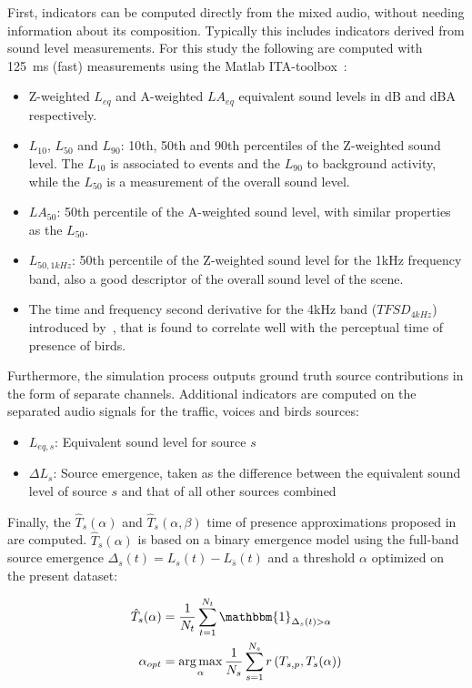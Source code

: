 \documentclass[11pt,a4paper]{article}
\DeclareMathOperator*{\argmax}{arg\,max}
\begin{document}
First, indicators can be computed directly from the mixed audio, without needing information about its composition. Typically this includes indicators derived from sound level measurements. For this study the following are computed with 125~ms (fast) measurements using the Matlab ITA-toolbox~\cite{ita}:

\begin{itemize}
\item Z-weighted $L_{eq}$ and A-weighted $LA_{eq}$ equivalent sound levels in dB and dBA respectively.
\item $L_{10}$, $L_{50}$ and $L_{90}$: 10th, 50th and 90th percentiles of the Z-weighted sound level. The $L_{10}$ is associated to events and the $L_{90}$ to background activity, while the $L_{50}$ is a measurement of the overall sound level.
\item $LA_{50}$: 50th percentile of the A-weighted sound level, with similar properties as the $L_{50}$.
\item $L_{50, 1kHz}$: 50th percentile of the Z-weighted sound level for the 1kHz frequency band, also a good descriptor of the overall sound level of the scene.
\item The time and frequency second derivative for the 4kHz band ($TFSD_{4kHz}$) introduced by~\cite{aumond}, that is found to correlate well with the perceptual time of presence of birds.
\end{itemize}

Furthermore, the simulation process outputs ground truth source contributions in the form of separate channels. Additional indicators are computed on the separated audio signals for the traffic, voices and birds sources:

\begin{itemize}
\item $L_{eq, s}$: Equivalent sound level for source $s$
\item $\Delta L_{s}$: Source emergence, taken as the difference between the equivalent sound level of source $s$ and that of all other sources combined
\end{itemize}

Finally, the $\hat T_s(\alpha)$ and $\hat T_s(\alpha, \beta)$ time of presence approximations proposed in~\cite{gontier} are computed. $\hat T_s(\alpha)$ is based on a binary emergence model using the full-band source emergence $\Delta_s(t) = L_s(t) - L_{\bar{s}}(t)$ and a threshold $\alpha$ optimized on the present dataset:

\begin{align}
\hat T_s(\alpha) &= \frac{1}{N_t}\sum_{t = 1}^{N_t}\mathbbm{1}_{\Delta_s(t)>\alpha}\\
\alpha_{opt} &= \argmax_{\alpha}\frac{1}{N_s}\sum_{s = 1}^{N_s}r\left(T_{s, p}, T_s(\alpha)\right)
\end{align}
\end{document}
